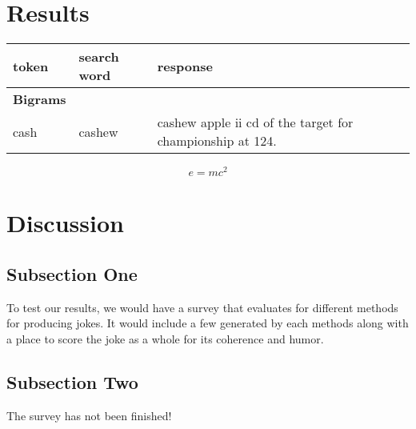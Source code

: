 \documentclass[twoside,twocolumn]{article}
\begin{document}
\section{Results}


\begin{center}
\begin{tabular}{llp{28mm}}
\toprule
token & search word & response\\
\midrule
\multicolumn{1}{l}{\textbf{Bigrams}} \\
\cmidrule(r){1-3}
cash & cashew & cashew apple ii cd of the target for championship at 124. \\
\bottomrule
\end{tabular}
\end{center}



\begin{equation}
\label{eq:emc}
e = mc^2
\end{equation}




\section{Discussion}

\subsection{Subsection One}

To test our results, we would have a survey that evaluates for different methods for producing jokes. It would include a few generated by each methods along with a place to score the joke as a whole for its coherence and humor.

\subsection{Subsection Two}

The survey has not been finished!


\end{document}
